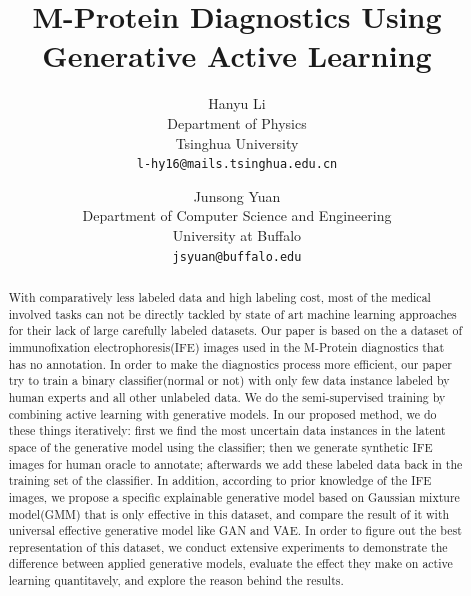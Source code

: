 \documentclass[10pt,twocolumn,letterpaper]{article}
\begin{document}
\title{M-Protein Diagnostics Using Generative Active Learning}


\author{Hanyu Li\\
Department of Physics\\
Tsinghua University\\
{\tt\small l-hy16@mails.tsinghua.edu.cn}
\and
Junsong Yuan\\
Department of Computer Science and Engineering\\
University at Buffalo\\
{\tt\small jsyuan@buffalo.edu}
}

\maketitle

\begin{abstract}
    With comparatively less labeled data and high labeling cost, most of the medical involved tasks can not be directly tackled by state of art machine learning approaches for their lack of large carefully labeled datasets. Our paper is based on the a dataset of immunofixation electrophoresis(IFE) images used in the M-Protein diagnostics that has no annotation. In order to make the diagnostics process more efficient, our paper try to train a binary classifier(normal or not) with only few data instance labeled by human experts and all other unlabeled data. We do the semi-supervised training by combining active learning with generative models. In our proposed method, we do these things iteratively: first we find the most uncertain data instances in the latent space of the generative model using the classifier; then we generate synthetic IFE images for human oracle to annotate; afterwards we add these labeled data back in the training set of the classifier. In addition, according to prior knowledge of the IFE images, we propose a specific explainable generative model based on Gaussian mixture model(GMM) that is only effective in this dataset, and compare the result of it with universal effective generative model like GAN and VAE. In order to figure out the best representation of this dataset, we conduct extensive experiments to demonstrate the difference between applied generative models, evaluate the effect they make on active learning quantitavely, and explore the reason behind the results.
\end{abstract}
\end{document}
